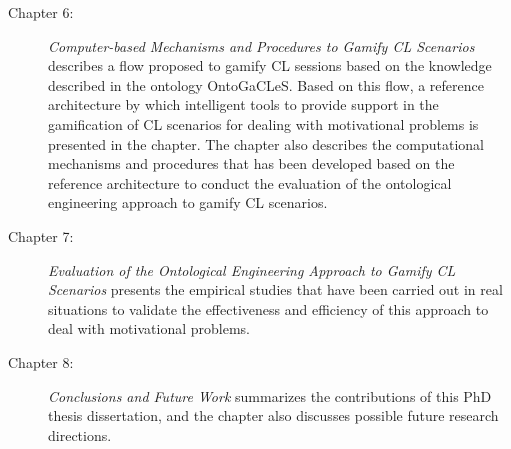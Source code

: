 \begin{description}
\item[Chapter 6:]
\emph{Computer-based Mechanisms and Procedures to Gamify CL Scenarios} describes a flow proposed to gamify CL sessions based on the knowledge described in the ontology OntoGaCLeS.
Based on this flow, a reference architecture by which intelligent tools to provide support in the gamification of CL scenarios for dealing with motivational problems is presented in the chapter.
The chapter also describes the computational mechanisms and procedures that has been developed based on the reference architecture to conduct the evaluation of the ontological engineering approach to gamify CL scenarios.

\item[Chapter 7:]
\emph{Evaluation of the Ontological Engineering Approach to Gamify CL Scenarios} presents the empirical studies that have been carried out in real situations to validate the effectiveness and efficiency of this approach to deal with motivational problems.

\item[Chapter 8:]
\emph{Conclusions and Future Work} summarizes the contributions of this PhD thesis dissertation, and the chapter also discusses possible future research directions.

\end{description}
